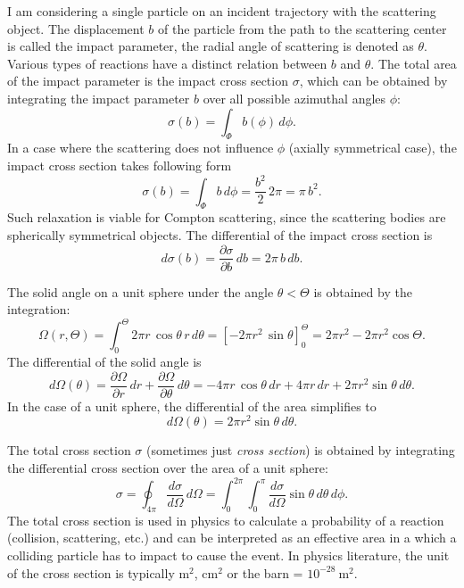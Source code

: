 \documentclass[a4paper,12pt,titlepage, twoside]{article}
\newcommand{\unit}[2]{$#1~\ensuremath{\mathrm{#2}}$}
\begin{document}
I am considering a single particle on an incident trajectory with the scattering object.
The displacement $b$ of the particle from the path to the scattering center is called the impact parameter, the radial angle of scattering is denoted as $\theta$.
Various types of reactions have a distinct relation between $b$ and $\theta$.
The total area of the impact parameter is the impact cross section $\sigma$, which can be obtained by integrating the impact parameter $b$ over all possible azimuthal angles $\phi$:
\begin{equation}
  \sigma\left(b\right) = \int_\Phi b\left(\phi\right)\,d\phi.
\end{equation}
In a case where the scattering does not influence $\phi$ (axially symmetrical case), the impact cross section takes following form
\begin{equation}
  \sigma\left(b\right) = \int_\Phi b\,d\phi = \frac{b^{2}}{2}\,2\pi = \pi\,b^2.
\end{equation}
Such relaxation is viable for Compton scattering, since the scattering bodies are spherically symmetrical objects.
The differential of the impact cross section is
\begin{equation}
  d\sigma\left(b\right) = \frac{\partial \sigma}{\partial b}\,db = 2\pi\,b\,db.
\end{equation}

The solid angle on a unit sphere under the angle $\theta < \Theta$ is obtained by the integration:
\begin{equation}
  \Omega\left(r, \Theta\right) = \int_0^\Theta 2\pi r\,\cos\theta\,r\,d\theta = \left[-2\pi r^2\,\sin\theta\right]_0^\Theta = 2\pi r^2 - 2\pi r^2\cos\Theta.
\end{equation}
The differential of the solid angle is
\begin{equation}
  d\Omega\left(\theta\right) = \frac{\partial \Omega}{\partial r}\,dr + \frac{\partial \Omega}{\partial \theta}\,d\theta = -4\pi r\,\cos\theta\,dr + 4\pi r\,dr + 2\pi r^2\sin\theta\,d\theta.
\end{equation}
In the case of a unit sphere, the differential of the area simplifies to
\begin{equation}
  d\Omega(\theta) = 2\pi r^2\sin\theta\,d\theta.
\end{equation}

The total cross section $\sigma$ (sometimes just \emph{cross section}) is obtained by integrating the differential cross section over the area of a unit sphere:
\begin{equation}
  \sigma = \oint_{4\pi} \frac{d\sigma}{d\Omega}\,d\Omega = \int_0^{2\pi} \int_0^{\pi} \frac{d\sigma}{d\Omega}\sin\theta\,d\theta\,d\phi.
\end{equation}
The total cross section is used in physics to calculate a probability of a reaction (collision, scattering, etc.) and can be interpreted as an effective area in a which a colliding particle has to impact to cause the event.
In physics literature, the unit of the cross section is typically $\mathrm{m}^2$, $\mathrm{cm}^2$ or the barn = \unit{10^{-28}}{m^2}.
\end{document}
